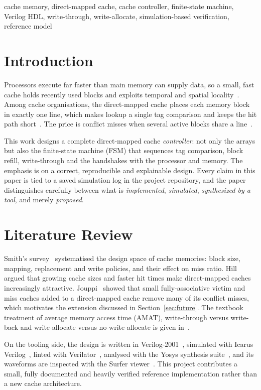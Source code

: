 \documentclass[conference]{IEEEtran}
\begin{document}
\begin{IEEEkeywords}
cache memory, direct-mapped cache, cache controller, finite-state machine, Verilog HDL, write-through, write-allocate, simulation-based verification, reference model
\end{IEEEkeywords}

\section{Introduction}
Processors execute far faster than main memory can supply data, so a small, fast cache holds recently used blocks and exploits temporal and spatial locality~\cite{smith1982,hennessy2017}. Among cache organisations, the direct-mapped cache places each memory block in exactly one line, which makes lookup a single tag comparison and keeps the hit path short~\cite{hill1988}. The price is conflict misses when several active blocks share a line~\cite{hennessy2017}.

This work designs a complete direct-mapped cache \emph{controller}: not only the arrays but also the finite-state machine (FSM) that sequences tag comparison, block refill, write-through and the handshakes with the processor and memory. The emphasis is on a correct, reproducible and explainable design. Every claim in this paper is tied to a saved simulation log in the project repository, and the paper distinguishes carefully between what is \emph{implemented}, \emph{simulated}, \emph{synthesized by a tool}, and merely \emph{proposed}.

\section{Literature Review}
Smith's survey~\cite{smith1982} systematised the design space of cache memories: block size, mapping, replacement and write policies, and their effect on miss ratio. Hill~\cite{hill1988} argued that growing cache sizes and faster hit times make direct-mapped caches increasingly attractive. Jouppi~\cite{jouppi1990} showed that small fully-associative victim and miss caches added to a direct-mapped cache remove many of its conflict misses, which motivates the extension discussed in Section~\ref{sec:future}. The textbook treatment of average memory access time (AMAT), write-through versus write-back and write-allocate versus no-write-allocate is given in~\cite{hennessy2017}.

On the tooling side, the design is written in Verilog-2001~\cite{ieee1364}, simulated with Icarus Verilog~\cite{iverilog}, linted with Verilator~\cite{verilator}, analysed with the Yosys synthesis suite~\cite{wolf2013,yosys}, and its waveforms are inspected with the Surfer viewer~\cite{surfer}. This project contributes a small, fully documented and heavily verified reference implementation rather than a new cache architecture.
\end{document}
